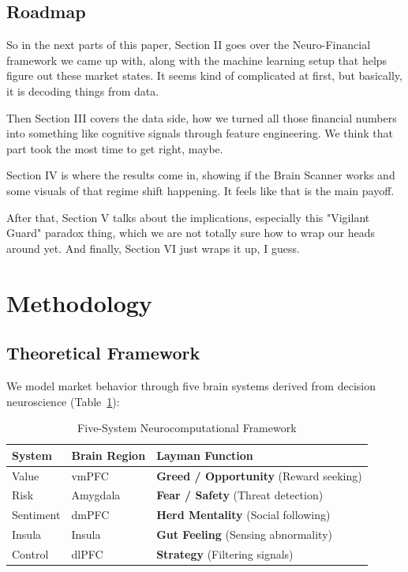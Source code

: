 \documentclass[conference]{IEEEtran}
\begin{document}
\subsection{Roadmap}
So in the next parts of this paper, Section II goes over the Neuro-Financial framework we came up with, along with the machine learning setup that helps figure out these market states. It seems kind of complicated at first, but basically, it is decoding things from data.

Then Section III covers the data side, how we turned all those financial numbers into something like cognitive signals through feature engineering. We think that part took the most time to get right, maybe.

Section IV is where the results come in, showing if the Brain Scanner works and some visuals of that regime shift happening. It feels like that is the main payoff.

After that, Section V talks about the implications, especially this "Vigilant Guard" paradox thing, which we are not totally sure how to wrap our heads around yet. And finally, Section VI just wraps it up, I guess.



\section{Methodology}

\subsection{Theoretical Framework}


We model market behavior through five brain systems derived from decision neuroscience (Table~\ref{tab:brain-systems}):


\begin{table}[htbp]
\centering
\caption{Five-System Neurocomputational Framework}
\label{tab:brain-systems}
\small
\begin{tabular}{@{}lll@{}}
\toprule
\textbf{System} & \textbf{Brain Region} & \textbf{Layman Function} \\
\midrule
Value & vmPFC & \textbf{Greed / Opportunity} (Reward seeking) \\
Risk & Amygdala & \textbf{Fear / Safety} (Threat detection) \\
Sentiment & dmPFC & \textbf{Herd Mentality} (Social following) \\
Insula & Insula & \textbf{Gut Feeling} (Sensing abnormality) \\
Control & dlPFC & \textbf{Strategy} (Filtering signals) \\
\bottomrule
\end{tabular}
\end{table}
\end{document}
